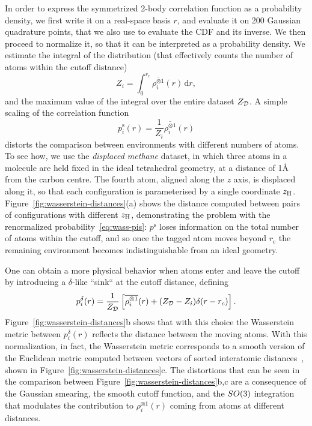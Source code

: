 In order to express the symmetrized 2-body correlation function as a probability density, we first write it on a real-space basis $r$, and evaluate it on 200 Gaussian quadrature points, that we also use to evaluate the CDF and its inverse. 
We then proceed to normalize it, so that it can be interpreted as a probability density.
We estimate the integral of the distribution (that effectively counts the number of atoms within the cutoff distance) 
\begin{equation}
Z_i = \int_0^{r_c} \overline{\rho_i^{\otimes 1}}(r)\,\mathrm{d}r,
\end{equation}
and the maximum value of the integral over the entire dataset $Z_{\mathcal{D}}$.
A simple scaling of the correlation function 
\begin{equation}
p_i^{\text{s}}(r) = \frac1{Z_i} \overline{\rho_i^{\otimes 1}}(r)\label{eq:wass-pis}
\end{equation}
distorts the comparison between environments with different numbers of atoms.
To see how, we use the \emph{displaced methane} dataset, in which three atoms in a  molecule are held fixed in the ideal tetrahedral geometry, at a distance of 1\AA{} from the carbon centre. The fourth atom, aligned along the $z$ axis, is displaced along it, so that each configuration is parameterised by a single coordinate $\zh$.
Figure~\ref{fig:wasserstein-distances}(a) shows the distance computed between pairs of configurations with different $\zh$,  demonstrating the problem with the renormalized probability~\eqref{eq:wass-pis}: $p^{\text{s}}$ loses information on the total number of atoms within the cutoff, and so once the tagged atom moves beyond $r_\text{c}$ the remaining  environment becomes indistinguishable from an ideal  geometry. 

One can obtain a more physical behavior when atoms enter and leave the cutoff by introducing a $\delta$-like ``sink`` at the cutoff distance, defining
\begin{equation}
p^{\delta}_i(r) = \frac{1}{Z_{\mathcal{D}}}\left[\overline{\rho_i^{\otimes 1}}(r) + (Z_{\mathcal{D}}-Z_i)\delta(r-r_c)\right].
\end{equation}
Figure~\ref{fig:wasserstein-distances}b shows that with this choice the Wasserstein metric between $p_i^\delta(r)$ reflects the distance between the moving atoms. With this normalization, in fact, the Wasserstein metric corresponds to a smooth version of the Euclidean metric computed between vectors of sorted interatomic distances~\cite{will+19jcp}, shown in Figure~\ref{fig:wasserstein-distances}c. 
The distortions that can be seen in the comparison between Figure~\ref{fig:wasserstein-distances}b,c are a consequence of the Gaussian smearing, the smooth cutoff function, and the ${SO(3)}$ integration that modulates the contribution to $\overline{\rho_i^{\otimes 1}}(r)$ coming from atoms at different distances.

